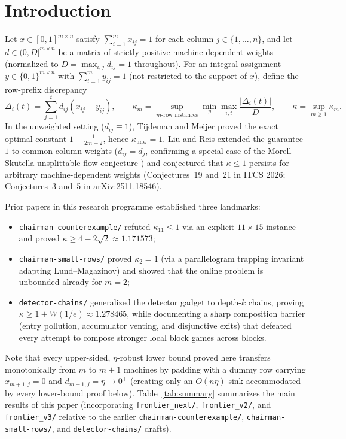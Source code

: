 \documentclass[11pt]{article}
\theoremstyle{definition}
\newcommand{\disc}{\Delta}
\newcommand{\W}{W}
\begin{document}
\section{Introduction}

Let $x\in[0,1]^{m\times n}$ satisfy $\sum_{i=1}^m x_{ij}=1$ for each column $j\in\{1,\dots,n\}$, and let $d\in(0,D]^{m\times n}$ be a matrix of strictly positive machine-dependent weights (normalized to $D=\max_{i,j}d_{ij}=1$ throughout). For an integral assignment $y\in\{0,1\}^{m\times n}$ with $\sum_{i=1}^m y_{ij}=1$ (not restricted to the support of $x$), define the row-prefix discrepancy
\[
 \disc_i(t)=\sum_{j=1}^t d_{ij}(x_{ij}-y_{ij}),\qquad
 \kappa_m=\sup_{m\text{-row instances}}\min_y\max_{i,t}\frac{|\disc_i(t)|}{D},\qquad
 \kappa=\sup_{m\ge1}\kappa_m.
\]
In the unweighted setting ($d_{ij}\equiv 1$), Tijdeman \cite{Tijdeman1973,Tijdeman1980} and Meijer \cite{Meijer1973} proved the exact optimal constant $1-\frac{1}{2m-2}$, hence $\kappa_{\text{unw}}=1$. Liu and Reis \cite{LiuReis2026} extended the guarantee $1$ to common column weights ($d_{ij}=d_j$, confirming a special case of the Morell--Skutella unsplittable-flow conjecture \cite{MorellSkutella2022}) and conjectured that $\kappa\le 1$ persists for arbitrary machine-dependent weights (Conjectures~19 and~21 in ITCS 2026; Conjectures~3 and~5 in arXiv:2511.18546).

Prior papers in this research programme established three landmarks:
\begin{itemize}
\item \texttt{chairman-counterexample/} refuted $\kappa_{11}\le 1$ via an explicit $11\times 15$ instance and proved $\kappa\ge 4-2\sqrt{2}\approx 1.171573$;
\item \texttt{chairman-small-rows/} proved $\kappa_2=1$ (via a parallelogram trapping invariant adapting Lund--Magazinov) and showed that the online problem is unbounded already for $m=2$;
\item \texttt{detector-chains/} generalized the detector gadget to depth-$k$ chains, proving $\kappa\ge 1+\W(1/e)\approx 1.278465$, while documenting a sharp composition barrier (entry pollution, accumulator venting, and disjunctive exits) that defeated every attempt to compose stronger local block games across blocks.
\end{itemize}

Note that every upper-sided, $\eta$-robust lower bound proved here transfers monotonically from $m$ to $m+1$ machines by padding with a dummy row carrying $x_{m+1,j}=0$ and $d_{m+1,j}=\eta\to 0^+$ (creating only an $O(n\eta)$ sink accommodated by every lower-bound proof below). Table~\ref{tab:summary} summarizes the main results of this paper (incorporating \texttt{frontier\_next/}, \texttt{frontier\_v2/}, and \texttt{frontier\_v3/} relative to the earlier \texttt{chairman-counterexample/}, \texttt{chairman-small-rows/}, and \texttt{detector-chains/} drafts).
\end{document}
